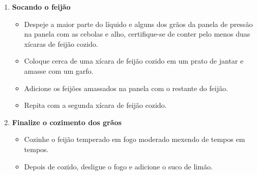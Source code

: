 \documentclass [11pt, letterpaper] {article}
\begin{document}
\begin {description}
\begin {enumerate}
\item {\bf Socando o feij\~ao}
\begin {itemize}
\item Despeje a maior parte do líquido e alguns dos grãos da panela de pressão na panela com as cebolas e alho, certifique-se de conter pelo menos duas xícaras de feijão cozido.
\item Coloque cerca de uma x\'icara de feijão cozido em um prato de jantar e amasse com um garfo.
\item Adicione os feijões amassados na panela com o restante do feijão.
\item Repita com a segunda x\'icara de feijão cozido.
\end {itemize}

\item {\bf Finalize o cozimento dos grãos}
\begin {itemize}
\item Cozinhe o feijão temperado em fogo moderado mexendo de tempos em tempos.
\item Depois de cozido, desligue o fogo e adicione o suco de limão.
\end {itemize}
\end {enumerate}
\end {description}
\end{document}
